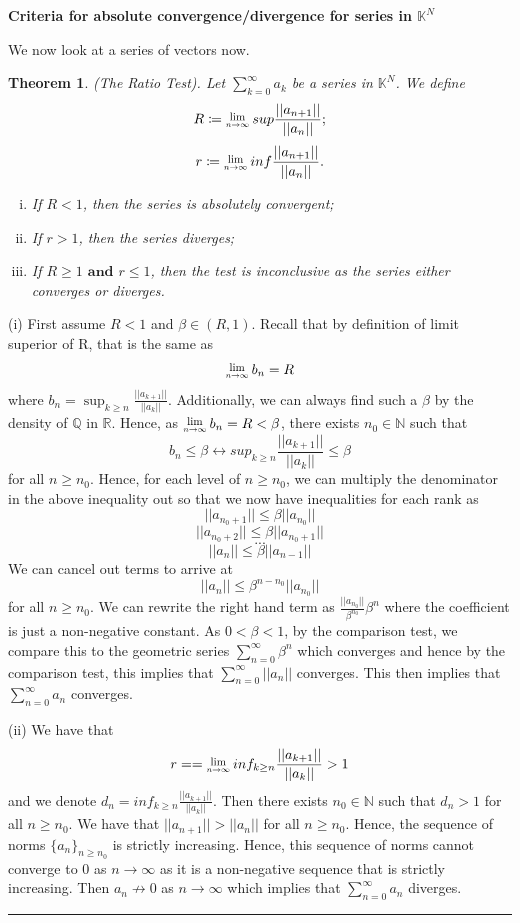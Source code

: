 \documentclass[twoside]{article}
\newcounter{lecnum}
\newcommand{\Lim}[1]{\raisebox{0.5ex}{\scalebox{0.8}{$\displaystyle \lim_{#1}\;$}}}
\newtheorem{theorem}{Theorem}[lecnum]
\newenvironment{proof}{{\bf Proof:}}{\hfill\rule{2mm}{2mm}}
\begin{document}
\bigskip
\textbf{Criteria for absolute convergence/divergence for series in $\mathbb{K}^N$}
\bigskip

We now look at a series of vectors now.
\begin{theorem}(The Ratio Test). Let $\sum_{k=0}^{\infty}a_k$ be a series in $\mathbb{K}^N$. We define
$$
R \coloneqq \Lim{n \rightarrow \infty}sup\frac{||a_{n+1}||}{||a_n||};
$$
$$
r \coloneqq \Lim{n \rightarrow \infty}inf\frac{||a_{n+1}||}{||a_n||}.
$$
\begin{enumerate}[(i)]
  \item If $R < 1$, then the series is absolutely convergent;
  \item If $r > 1$, then the series diverges;
  \item If $R \geq 1$ $\textbf{and}$ $r \leq 1$, then the test is inconclusive as the series either converges or diverges.
\end{enumerate}
\end{theorem}

\begin{proof}
(i) First assume $R < 1$ and $\beta \in (R,1)$. Recall that by definition of limit superior of R, that is the same as
$$
\Lim{n \rightarrow \infty}b_n = R
$$
where $b_n = \sup_{k \geq n}\frac{||a_{k+1}||}{||a_k||}$. Additionally, we can always find such a $\beta$ by the density of $\mathbb{Q}$ in $\mathbb{R}$. Hence, as $\Lim{n \rightarrow \infty}b_n = R < \beta$, there exists $n_0 \in \mathbb{N}$ such that
$$
b_n \leq \beta \leftrightarrow sup_{k \geq n}\frac{||a_{k+1}||}{||a_k||} \leq \beta
$$
for all $n \geq n_0$. Hence, for each level of $n \geq n_0$, we can multiply the denominator in the above inequality out so that we now have inequalities for each rank as
$$
||a_{n_0 + 1}|| \leq \beta ||a_{n_0}||
$$
$$
||a_{n_0 + 2}|| \leq \beta ||a_{n_0 + 1}||
$$
$$
...
$$
$$
||a_{n}|| \leq \beta ||a_{n - 1}||
$$
We can cancel out terms to arrive at
$$
||a_n|| \leq \beta^{n - n_0}||a_{n_0}||
$$
for all $n \geq n_0$. We can rewrite the right hand term as $\frac{||a_{n_0}||}{\beta^{n_0}}\beta^n$ where the coefficient is just a non-negative constant. As $0 < \beta < 1$, by the comparison test, we compare this to the geometric series $\sum_{n=0}^{\infty}\beta^n$ which converges and hence by the comparison test, this implies that $\sum_{n=0}^{\infty}||a_n||$ converges. This then implies that $\sum_{n = 0}^{\infty}a_n$ converges.

\bigskip

(ii) We have that 
$$
r == \Lim{n \rightarrow \infty}inf_{k \geq n}\frac{||a_{k+1}||}{||a_k||} > 1
$$
and we denote $d_n = inf_{k \geq n}\frac{||a_{k+1}||}{||a_k||}$. Then there exists $n_0 \in \mathbb{N}$ such that $d_n > 1$ for all $n \geq n_0$. We have that $||a_{n+1}|| > ||a_n||$ for all $n \geq n_0$. Hence, the sequence of norms $\{a_n\}_{n \geq n_0}$ is strictly increasing. Hence, this sequence of norms cannot converge to 0 as $n \rightarrow \infty$ as it is a non-negative sequence that is strictly increasing. Then $a_n \not \rightarrow 0$ as $n \rightarrow \infty$ which implies that $\sum_{n=0}^{\infty}a_n$ diverges.
\end{proof}
\end{document}
